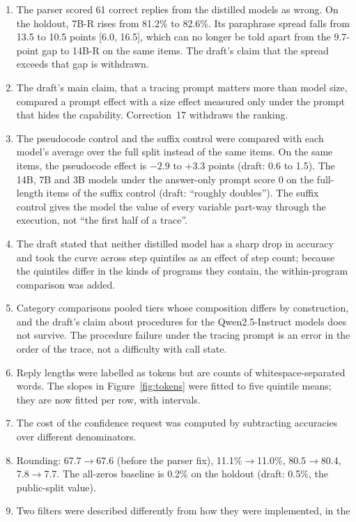 \documentclass[10pt]{article}
\begin{document}
\begin{enumerate}\setlength{\itemsep}{0pt}\setlength{\parskip}{0pt}
\item The parser scored 61 correct replies from the distilled models as wrong. On the
holdout, 7B-R rises from 81.2\% to 82.6\%. Its paraphrase spread falls from 13.5 to
10.5 points [6.0, 16.5], which can no longer be told apart from the 9.7-point gap to
14B-R on the same items. The draft's claim that the spread exceeds that gap is
withdrawn.
\item The draft's main claim, that a tracing prompt matters more than model size,
compared a prompt effect with a size effect measured only under the prompt that hides the
capability. Correction~17 withdraws the ranking.
\item The pseudocode control and the suffix control were compared with each model's
average over the full split instead of the same items. On the same items, the pseudocode
effect is $-2.9$ to $+3.3$ points (draft: 0.6 to 1.5). The 14B, 7B and 3B models under
the answer-only prompt score 0 on the full-length items of the suffix control (draft:
``roughly doubles''). The suffix control gives the model the value of every variable part-way through the
execution, not ``the first half of a trace''.
\item The draft stated that neither distilled model has a sharp drop in accuracy and
took the curve across step quintiles as an effect of step count; because the quintiles
differ in the kinds of programs they contain, the within-program comparison was added.
\item Category comparisons pooled tiers whose composition differs by construction, and
the draft's claim about procedures for the Qwen2.5-Instruct models does not survive. The
procedure failure under the tracing prompt is an error in the order of the trace, not a
difficulty with call state.
\item Reply lengths were labelled as tokens but are counts of whitespace-separated
words. The slopes in Figure~\ref{fig:tokens} were fitted to five quintile means; they
are now fitted per row, with intervals.
\item The cost of the confidence request was computed by subtracting accuracies over
different denominators.
\item Rounding: 67.7$\to$67.6 (before the parser fix), 11.1\%$\to$11.0\%,
80.5$\to$80.4, 7.8$\to$7.7. The all-zeros baseline is 0.2\% on the holdout (draft: 0.5\%,
the public-split value).
\item Two filters were described differently from how they were implemented, in the

\end{enumerate}
\end{document}
